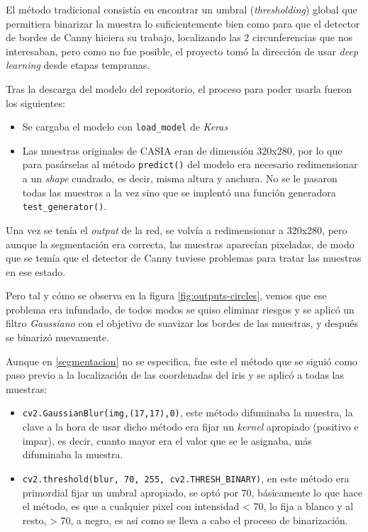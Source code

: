 El método tradicional consistía en encontrar un umbral (\emph{thresholding}) global que permitiera binarizar la muestra lo suficientemente bien como para que el detector de bordes de Canny hiciera su trabajo, localizando las 2 circunferencias que nos interesaban, pero como no fue posible, el proyecto tomó la dirección de usar \emph{deep learning} desde etapas tempranas.

Tras la descarga del modelo del repositorio, el proceso para poder usarla fueron los siguientes:
\begin{itemize}
    \item Se cargaba el modelo con \texttt{load\_model} de \emph{Keras}
    \item Las muestras originales de CASIA eran de dimensión 320x280, por lo que para pasárselas al método \texttt{predict()} del modelo era necesario redimensionar a un \emph{shape} cuadrado, es decir, misma altura y anchura.
    No se le pasaron todas las muestras a la vez sino que se implentó una función generadora \texttt{test\_generator()}.
\end{itemize}

Una vez se tenía el \emph{output} de la red, se volvía a redimensionar a 320x280, pero aunque la segmentación era correcta, las muestras aparecían pixeladas, de modo que se temía que el detector de Canny tuviese problemas para tratar las muestras en ese estado.

Pero tal y cómo se observa en la figura \ref{fig:outputs-circles}, vemos que ese problema era infundado, de todos modos se quiso eliminar riesgos y se aplicó un filtro \emph{Gaussiano} con el objetivo de suavizar los bordes de las muestras, y después se binarizó nuevamente.

Aunque en \ref{segmentacion} no se especifica, fue este el método que se siguió como paso previo a la localización de las coordenadas del iris y se aplicó a todas las muestras:
\begin{itemize}
    \item \texttt{cv2.GaussianBlur(img,(17,17),0)}, este método difuminaba la muestra, la clave a la hora de usar dicho método era fijar un \emph{kernel} apropiado (positivo e impar), es decir, cuanto mayor era el valor que se le asignaba, más difuminaba la muestra.
    \item \texttt{cv2.threshold(blur, 70, 255, cv2.THRESH\_BINARY)}, en este método era primordial fijar un umbral apropiado, se optó por 70, básicamente lo que hace el método, es que a cualquier pixel con intensidad < 70, lo fija a blanco y al resto, > 70, a negro, es así como se lleva a cabo el proceso de binarización.
\end{itemize}

